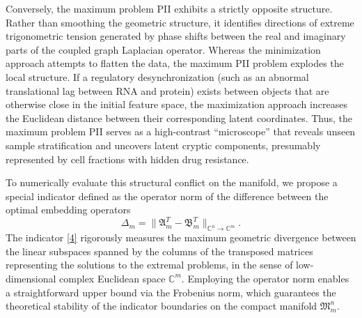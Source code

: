 \documentclass[a4paper,twoside,12pt]{article}
\begin{document}
Conversely, the maximum problem \textnormal{PII} exhibits a strictly opposite structure. Rather than smoothing the geometric structure, it  identifies directions of extreme trigonometric tension   generated by phase shifts between the real and imaginary parts of the coupled graph Laplacian operator.
 Whereas the minimization  approach   attempts to  flatten  the data, the maximum  \textnormal{PII} problem explodes  the local structure.  If a  regulatory  desynchronization (such as an abnormal translational lag between RNA and protein) exists between objects that are otherwise close in the initial feature  space, the maximization  approach increases  the Euclidean distance between their corresponding latent coordinates.  Thus, the maximum problem  \textnormal{PII}   serves as a high-contrast ``microscope'' that reveals  unseen  sample stratification and uncovers   latent cryptic components, presumably represented by cell fractions with hidden drug resistance.

To numerically evaluate this structural conflict on the manifold, we propose a special indicator defined as the operator  norm of the difference between the optimal embedding operators
\begin{equation}\label{4}
\Delta_ m  = \|\mathfrak{A}^{T}_{m} - \mathfrak{B}^{T}_{m}\|_{\mathbb{C}^{n}\rightarrow \mathbb{C}^{m}}.
\end{equation}
 The indicator \eqref{4} rigorously measures the maximum geometric divergence between the linear subspaces spanned by the columns of the transposed matrices representing the solutions to the extremal problems, in the sense of   low-dimensional complex Euclidean space $\mathbb{C}^{m}.$
Employing the operator norm enables a straightforward upper bound via the Frobenius norm, which guarantees the theoretical stability of the indicator boundaries on the compact manifold $\mathfrak{M}^{n}_{m}.$
\end{document}
